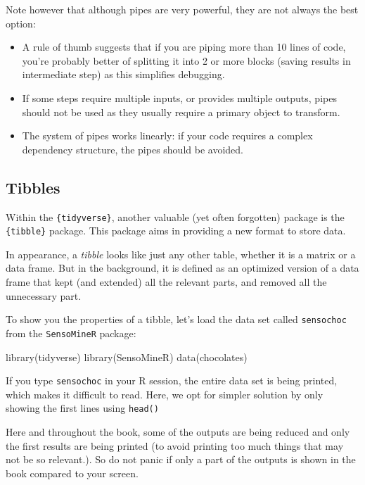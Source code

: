 \documentclass[
]{krantz}
\makeatletter
\newenvironment{Shaded}{\begin{snugshade}}{\end{snugshade}}
\newcommand{\FunctionTok}[1]{\textcolor[rgb]{0,0,0}{#1}}
\newcommand{\NormalTok}[1]{#1}
\providecommand{\tightlist}{%
  \setlength{\itemsep}{0pt}\setlength{\parskip}{0pt}}
\renewenvironment{quote}{\begin{VF}}{\end{VF}}
\newenvironment{kframe}{%
\medskip{}
\setlength{\fboxsep}{.8em}
 \def\at@end@of@kframe{}%
 \ifinner\ifhmode%
  \def\at@end@of@kframe{\end{minipage}}%
  \begin{minipage}{\columnwidth}%
 \fi\fi%
 \def\FrameCommand##1{\hskip\@totalleftmargin \hskip-\fboxsep
 \colorbox{shadecolor}{##1}\hskip-\fboxsep
     \hskip-\linewidth \hskip-\@totalleftmargin \hskip\columnwidth}%
 \MakeFramed {\advance\hsize-\width
   \@totalleftmargin\z@ \linewidth\hsize
   \@setminipage}}%
 {\par\unskip\endMakeFramed%
 \at@end@of@kframe}
\renewenvironment{Shaded}{\begin{kframe}}{\end{kframe}}
\makeatother
\begin{document}
Note however that although pipes are very powerful, they are not always the best option:

\begin{itemize}
\tightlist
\item
  A rule of thumb suggests that if you are piping more than 10 lines of code, you're probably better of splitting it into 2 or more blocks (saving results in intermediate step) as this simplifies debugging.
\item
  If some steps require multiple inputs, or provides multiple outputs, pipes should not be used as they usually require a primary object to transform.
\item
  The system of pipes works linearly: if your code requires a complex dependency structure, the pipes should be avoided.
\end{itemize}

\hypertarget{tibbles}{%
\subsection{Tibbles}\label{tibbles}}

Within the \texttt{\{tidyverse\}}, another valuable (yet often forgotten) package is the \texttt{\{tibble\}} package. This package aims in providing a new format to store data.

In appearance, a \emph{tibble} looks like just any other table, whether it is a matrix or a data frame. But in the background, it is defined as an optimized version of a data frame that kept (and extended) all the relevant parts, and removed all the unnecessary part.

To show you the properties of a tibble, let's load the data set called \texttt{sensochoc} from the \texttt{SensoMineR} package:

\begin{Shaded}
\begin{Highlighting}[]
\FunctionTok{library}\NormalTok{(tidyverse)}
\FunctionTok{library}\NormalTok{(SensoMineR)}
\FunctionTok{data}\NormalTok{(chocolates)}
\end{Highlighting}
\end{Shaded}

If you type \texttt{sensochoc} in your R session, the entire data set is being printed, which makes it difficult to read. Here, we opt for simpler solution by only showing the first lines using \texttt{head()}

\begin{quote}
Here and throughout the book, some of the outputs are being reduced and only the first results are being printed (to avoid printing too much things that may not be so relevant.). So do not panic if only a part of the outputs is shown in the book compared to your screen.
\end{quote}
\end{document}
